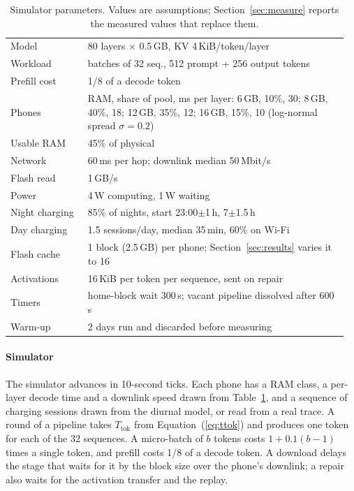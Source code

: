 \documentclass[preprint,review,12pt,authoryear]{elsarticle}
\begin{document}
\begin{table}[t]
\caption{Simulator parameters. Values are assumptions; Section~\ref{sec:measure}
reports the measured values that replace them.}
\label{tab:params}
\small
\begin{tabular}{@{}p{0.22\linewidth}p{0.74\linewidth}@{}}
\toprule
Model & 80 layers $\times$ 0.5\,GB, KV 4\,KiB/token/layer\\
Workload & batches of 32 seq., 512 prompt + 256 output tokens\\
Prefill cost & 1/8 of a decode token\\
Phones & RAM, share of pool, ms per layer: 6\,GB, 10\%, 30; 8\,GB, 40\%, 18; 12\,GB, 35\%, 12; 16\,GB, 15\%, 10 (log-normal spread $\sigma{=}0.2$)\\
Usable RAM & 45\% of physical\\
Network & 60\,ms per hop; downlink median 50\,Mbit/s\\
Flash read & 1\,GB/s\\
Power & 4\,W computing, 1\,W waiting\\
Night charging & 85\% of nights, start 23:00$\pm$1\,h, 7$\pm$1.5\,h\\
Day charging & 1.5 sessions/day, median 35\,min, 60\% on Wi-Fi\\
Flash cache & 1 block (2.5\,GB) per phone; Section~\ref{sec:results} varies it to 16\\
Activations & 16\,KiB per token per sequence, sent on repair\\
Timers & home-block wait 300\,s; vacant pipeline dissolved after 600\,s\\
Warm-up & 2 days run and discarded before measuring\\
\bottomrule
\end{tabular}
\end{table}

\paragraph{Simulator} The simulator advances in 10-second ticks. Each phone has
a RAM class, a per-layer decode time and a downlink speed drawn from
Table~\ref{tab:params}, and a sequence of charging sessions drawn from the
diurnal model, or read from a real trace. A round of a pipeline takes
$T_{\text{tok}}$ from Equation~(\ref{eq:ttok}) and produces one token for each
of the 32 sequences. A micro-batch of $b$ tokens costs $1+0.1(b-1)$ times a
single token, and prefill costs 1/8 of a decode token. A download delays the
stage that waits for it by the block size over the phone's downlink; a repair
also waits for the activation transfer and the replay.
\end{document}
